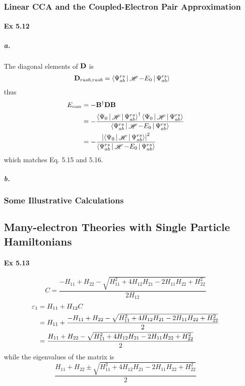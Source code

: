 \documentclass[a4paper]{article}
\DeclareMathOperator{\sH}{\mathscr{H}}
\DeclareMathOperator{\corr}{\mathrm{corr}}
\newcommand{\ex}[1]{\paragraph{Ex #1}}
\newcommand{\subex}[1]{\subparagraph{#1}}
\numberwithin{equation}{subsection}
\begin{document}
\subsubsection{Linear CCA and the Coupled-Electron Pair Approximation}
\ex{5.12}
\subex{a.}
The diagonal elements of $ \vb{D} $ is
\begin{align}
\vb{D}_{rasb, rasb} &= \Braket{\Psi_{ab}^{rs} | \sH - E_0 | \Psi_{ab}^{rs}} %
\end{align}
thus
\begin{align}
E_{\corr} &= -\vb{B}^\dagger \vb{D} \vb{B} \notag\\
&= - \dfrac{\Braket{\Psi_0 | \sH | \Psi_{ab}^{rs}}^\dagger \Braket{\Psi_0 | \sH | \Psi_{ab}^{rs}} }{\Braket{\Psi_{ab}^{rs} | \sH - E_0 | \Psi_{ab}^{rs}}} \notag\\
&= - \dfrac{\abs{\Braket{\Psi_0 | \sH | \Psi_{ab}^{rs}}}^2 }{\Braket{\Psi_{ab}^{rs} | \sH - E_0 | \Psi_{ab}^{rs}}} 
\end{align}
which matches Eq. 5.15 and 5.16.
\subex{b.}









\subsubsection{Some Illustrative Calculations}

\subsection{Many-electron Theories with Single Particle Hamiltonians}
\ex{5.13}
\begin{equation}\label{key}
C = \dfrac{-H_{11} + H_{22} - \sqrt{H_{11}^2 + 4H_{12}H_{21} - 2H_{11}H_{22} + H_{22}^2}}{2H_{12}}
\end{equation}
\begin{align}\label{key}
\varepsilon_1 &= H_{11} + H_{12}C \notag\\
&= H_{11} + \dfrac{-H_{11} + H_{22} - \sqrt{H_{11}^2 + 4H_{12}H_{21} - 2H_{11}H_{22} + H_{22}^2}}{2} \notag\\
&=  \dfrac{H_{11} + H_{22} - \sqrt{H_{11}^2 + 4H_{12}H_{21} - 2H_{11}H_{22} + H_{22}^2}}{2}
\end{align}
while the eigenvalues of the matrix is
\begin{equation}\label{key}
\dfrac{H_{11} + H_{22} \pm \sqrt{H_{11}^2 + 4H_{12}H_{21} - 2H_{11}H_{22} + H_{22}^2}}{2}
\end{equation}
\end{document}
